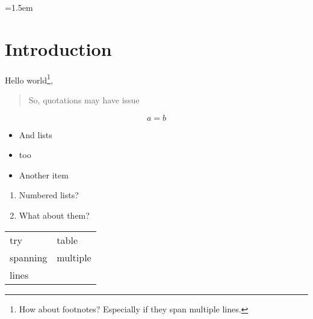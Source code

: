 \documentclass{article}
\begin{document}
\parindent=1.5em

\section{Introduction}

Hello world\footnote{How about footnotes? Especially if they span multiple lines. \lipsum[6]}, \lipsum[1-2]

\begin{quotation}
  So, quotations may have issue
\end{quotation}

\lipsum[2]
\[
  a=b
\]
\lipsum[6]

\begin{itemize}
  \item And lists
  \item too \lipsum[3]
  \item Another item
\end{itemize}

\begin{enumerate}
  \item Numbered lists?
  \item What about them?
\end{enumerate}


\lipsum[3]


\begin{table}[hbp]
  \begin{tabular}{l l}
    try & table\\
    spanning & multiple\\
    lines & \\
  \end{tabular}
\end{table}

\lipsum[2-3]

\noindent{}
\end{document}
